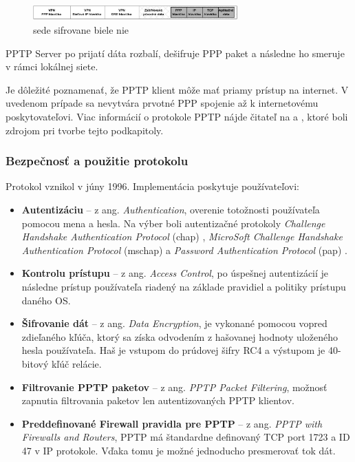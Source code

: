 \begin{figure}
	\centering
	\includegraphics[width=0.7\textwidth]{figures/pptpdat}
	\caption{sede sifrovane biele nie }
	\label{pptpdat}
\end{figure}

PPTP Server po prijatí dáta rozbalí, dešifruje PPP paket a následne ho smeruje v rámci lokálnej siete.

Je dôležité poznamenať, že PPTP klient môže mať priamy prístup na internet. V uvedenom prípade sa nevytvára prvotné PPP spojenie až k internetovému poskytovateľovi.
Viac informácií o protokole PPTP nájde čitateľ na \cite{rfc2637} a \cite{pptp}, ktoré boli zdrojom pri tvorbe tejto podkapitoly.
\subsubsection{Bezpečnosť a použitie protokolu} 
Protokol vznikol v júny 1996. Implementácia poskytuje používateľovi:
\begin{itemize}
	\item{\textbf{Autentizáciu}} -- z ang. \textit{Authentication}, overenie totožnosti používateľa pomocou mena a hesla. Na výber boli autentizačné protokoly \textit{Challenge Handshake Authentication Protocol} (\acrshort{chap}) \cite{chap}, \textit{MicroSoft Challenge Handshake Authentication Protocol} (\acrshort{mschap}) \cite{mschap} a \textit{Password Authentication Protocol} (\acrshort{pap}) \cite{pap}.  
	\item{\textbf{Kontrolu prístupu}} -- z ang. \textit{Access Control}, po úspešnej autentizácií je následne prístup používateľa riadený na základe pravidiel a politiky prístupu daného OS. 
	\item{\textbf{Šifrovanie dát}} -- z ang. \textit{Data Encryption}, je vykonané pomocou vopred zdieľaného kľúča, ktorý sa získa odvodením z hašovanej hodnoty uloženého hesla používateľa. Haš je vstupom do prúdovej šifry RC4 \cite{rc4} a výstupom je  40-bitový kľúč relácie. 
	\item{\textbf{Filtrovanie PPTP paketov}} -- z ang. \textit{PPTP Packet Filtering}, možnosť zapnutia filtrovania paketov len autentizovaných PPTP klientov.
	\item{\textbf{Preddefinované Firewall pravidla pre PPTP}} -- z ang. \textit{PPTP with Firewalls and Routers}, PPTP má štandardne definovaný TCP port 1723 a ID 47 v IP protokole. Vďaka tomu je možné jednoducho presmerovať tok dát.
\end{itemize} 

